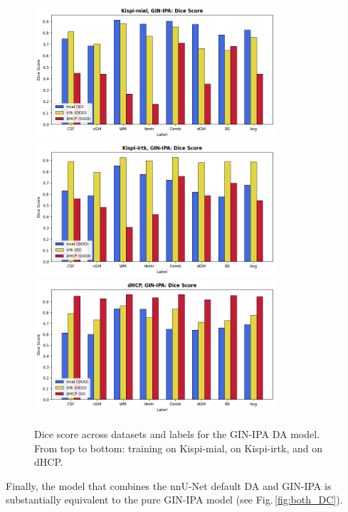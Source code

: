 \begin{figure}[htbp]
  \centering
  \includegraphics[width=0.8\textwidth]{figures/mial_ginipa_DC.png} \\
  \vspace{10pt}
  \includegraphics[width=0.8\textwidth]{figures/irtk_ginipa_DC.png} \\
  \vspace{10pt}
  \includegraphics[width=0.8\textwidth]{figures/dHCP_ginipa_DC.png}
  \caption{Dice score across datasets and labels for the GIN-IPA DA model. From top to bottom: training on Kispi-mial, on Kispi-irtk, and on dHCP.}
  \label{fig:ginipa_DC}
\end{figure}

Finally, the model that combines the nnU-Net default DA and GIN-IPA is substantially equivalent to the pure GIN-IPA model (see Fig.\,\ref{fig:both_DC}).

